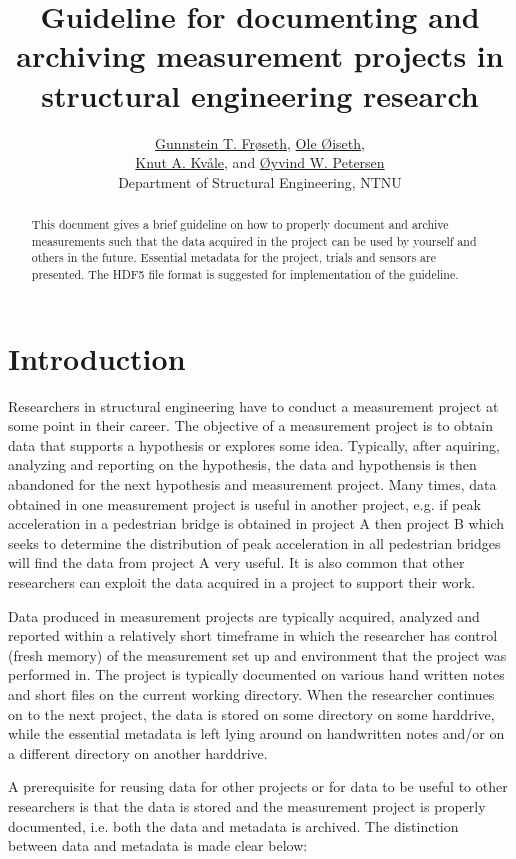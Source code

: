 \documentclass{article}
\title{Guideline for documenting and archiving measurement projects
  in structural engineering research}
\author
{\href{mailto:gunnstein.t.froseth@ntnu.no}{Gunnstein T. Frøseth},
  \href{mailto:ole.oiseth@ntnu.no}{Ole Øiseth},\\
  \href{mailto:knut.a.kvale@ntnu.no}{Knut A. Kvåle}, and
  \href{mailto:oivind.w.petersen@ntnu.no}{Øyvind W. Petersen}\\
  \small{Department of Structural Engineering, NTNU}
}
\begin{document}
\thispagestyle{empty}
\maketitle

\begin{abstract}
  This document gives a brief guideline on how to properly document
  and archive measurements such that the data acquired in the project
  can be used by yourself and others in the future. Essential metadata
  for the project, trials and sensors are presented. The HDF5 file
  format is suggested for implementation of the guideline.
\end{abstract}


\section{Introduction}

Researchers in structural engineering have to conduct a measurement
project at some point in their career. The objective of a measurement
project is to obtain data that supports a hypothesis or explores some
idea. Typically, after aquiring, analyzing and reporting on the
hypothesis, the data and hypothensis is then abandoned for the next
hypothesis and measurement project. Many times, data obtained in one
measurement project is useful in another project, e.g. if peak
acceleration in a pedestrian bridge is obtained in project A then
project B which seeks to determine the distribution of peak
acceleration in all pedestrian bridges will find the data from project
A very useful. It is also common that other researchers can exploit
the data acquired in a project to support their work.

Data produced in measurement projects are typically acquired, analyzed
and reported within a relatively short timeframe in which the
researcher has control (fresh memory) of the measurement set up and
environment that the project was performed in. The project is typically
documented on various hand written notes and short files on the
current working directory. When the researcher continues on to the
next project, the data is stored on some directory on some harddrive,
while the essential metadata is left lying around on handwritten notes
and/or on a different directory on another harddrive.

A prerequisite for reusing data for other projects or for data to be
useful to other researchers is that the data is stored and the
measurement project is properly documented, i.e. both the data and
metadata is archived. The distinction between data and metadata is
made clear below:
\end{document}
